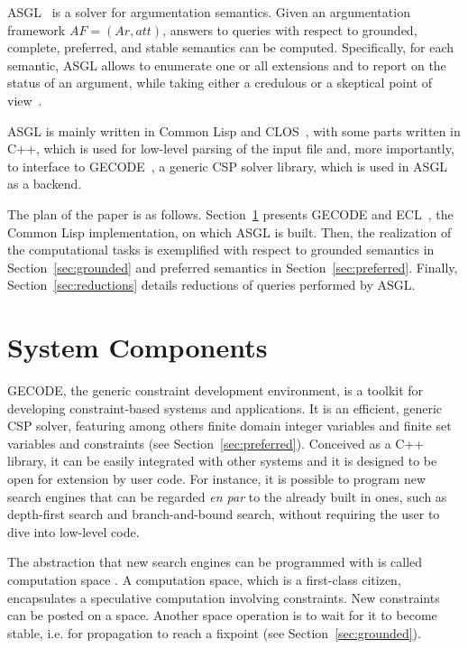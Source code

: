 \documentclass[runningheads,a4paper]{llncs}
\begin{document}
ASGL~\cite{asgl} is a solver for argumentation semantics. Given an
argumentation framework $AF = (Ar, att)$, answers to queries with
respect to grounded, complete, preferred, and stable semantics can be
computed. Specifically, for each semantic, ASGL allows to enumerate
one or all extensions and to report on the status of an argument,
while taking either a credulous or a skeptical point of
view~\cite{Modgil2009}.

ASGL is mainly written in Common Lisp and CLOS~\cite{Steele:1990:CLL},
with some parts written in C++, which is used for low-level parsing of
the input file and, more importantly, to interface to
GECODE~\cite{gecode}, a generic CSP solver library, which is used in
ASGL as a backend.

The plan of the paper is as follows. Section~\ref{sec:components}
presents GECODE and ECL~\cite{ecl}, the Common Lisp implementation, on
which ASGL is built. Then, the realization of the computational tasks
is exemplified with respect to grounded semantics in
Section~\ref{sec:grounded} and preferred semantics in
Section~\ref{sec:preferred}. Finally, Section~\ref{sec:reductions}
details reductions of queries performed by ASGL.
\section{System Components}\label{sec:components}

GECODE, the generic constraint development environment, is a toolkit
for developing constraint-based systems and applications. It is an
efficient, generic CSP solver, featuring among others finite domain
integer variables and finite set variables and constraints (see
Section~\ref{sec:preferred}). Conceived as a C++ library, it can be
easily integrated with other systems and it is designed to be open for
extension by user code.  For instance, it is possible to program new
search engines that can be regarded \textit{en par} to the already
built in ones, such as depth-first search and branch-and-bound search,
without requiring the user to dive into low-level code.

The abstraction that new search engines can be programmed with is
called computation space \cite{Engines:97}. A computation space, which
is a first-class citizen, encapsulates a speculative computation
involving constraints. New constraints can be posted on a
space. Another space operation is to wait for it to become stable,
i.e. for propagation to reach a fixpoint (see
Section~\ref{sec:grounded}).
\end{document}
